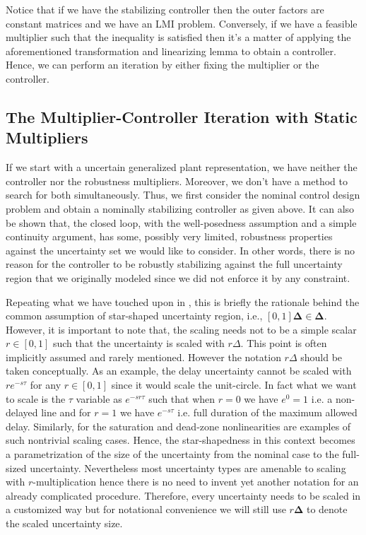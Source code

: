 Notice that if we have the stabilizing controller then the outer factors are constant matrices and we have an LMI problem. Conversely, if we have a 
feasible multiplier such that the inequality is satisfied then it's a matter of applying the aforementioned transformation and linearizing lemma to obtain
a controller. Hence, we can perform an iteration by either fixing the multiplier or the controller. 

\subsection{The Multiplier-Controller Iteration with Static Multipliers}

If we start with a uncertain generalized plant representation, we have neither the controller nor the robustness multipliers. Moreover, we don't have a 
method to search for both simultaneously. Thus, we first consider the nominal control design problem and obtain a nominally stabilizing controller as 
given above. It can also be shown that, the closed loop, with the well-posedness assumption and a simple continuity argument, has some, possibly very 
limited, robustness properties against the uncertainty set we would like to consider. In other words, there is no reason for the controller to be robustly 
stabilizing against the full uncertainty region that we originally modeled since we did not enforce it by any constraint. 

\begin{rem}Repeating what we have touched upon in ,
this is briefly the rationale behind the common assumption of star-shaped uncertainty region, i.e., $[0,1]\bm{\Delta}\in\bm{\Delta}$. However, it is 
important to note that, the scaling needs not to be a simple scalar $r\in[0,1]$ such that the uncertainty is scaled with $r\Delta$. This point is often
implicitly assumed and rarely mentioned. However the notation $r\Delta$ should be taken conceptually. As an example, 
the delay uncertainty cannot be scaled with $re^{-s\tau}$ for any $r\in[0,1]$ since it would scale the unit-circle. In fact what we want to scale 
is the $\tau$ variable as $e^{-sr\tau}$ such that when $r=0$ we have $e^0=1$ i.e. a non-delayed line and for $r=1$ we have $e^{-s\tau}$ i.e. full 
duration of the maximum allowed delay. Similarly, for the saturation and dead-zone nonlinearities are examples of such nontrivial scaling cases. Hence, 
the star-shapedness in this context becomes a parametrization of the size of the uncertainty from the nominal case to the full-sized uncertainty. 
Nevertheless most uncertainty types are amenable to scaling with $r$-multiplication hence there is no need to invent yet another
notation for an already complicated procedure. Therefore, every uncertainty needs to be scaled in a customized way but for notational convenience we will 
still use $r\bm{\Delta}$ to denote the scaled uncertainty size. 
\end{rem}





